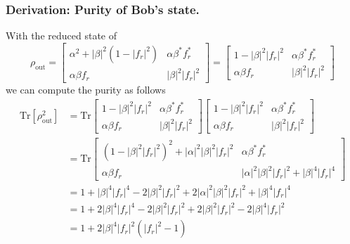 \documentclass[../../../main.tex]{subfiles}
\begin{document}
\subsubsection{Derivation: Purity of Bob's state.}
With the reduced state of
\begin{equation*}
  \rho_\text{out}
  = \begin{bmatrix}
    \alpha^2 + |\beta|^2 (1-|f_r|^2) & \alpha\beta^*  f_r^* \\
    \alpha\beta  f_r                 & |\beta|^2 |f_r|^2
  \end{bmatrix}
  = \begin{bmatrix}
    1- |\beta|^2 |f_r|^2 & \alpha\beta^*  f_r^* \\
    \alpha\beta  f_r     & |\beta|^2 |f_r|^2
  \end{bmatrix}
\end{equation*}
we can compute the purity as follows
\begin{align*}
  \mathrm{Tr} [\rho_\text{out}^2]
   & = \mathrm{Tr}
  \begin{bmatrix}
    1- |\beta|^2 |f_r|^2 & \alpha\beta^*  f_r^* \\
    \alpha\beta  f_r     & |\beta|^2 |f_r|^2
  \end{bmatrix}
  \begin{bmatrix}
    1- |\beta|^2 |f_r|^2 & \alpha\beta^*  f_r^* \\
    \alpha\beta  f_r     & |\beta|^2 |f_r|^2
  \end{bmatrix}                                                                               \\
   & =\mathrm{Tr} \begin{bmatrix}
                    (1-|\beta|^{2}|f_{r}|^{2})^2 + |\alpha|^{2}|\beta|^{2}|f_{r}|^{2} & \alpha\beta^{*}f_{r}^{*} \\
                    \alpha\beta f_{r}                                                 &
                    |\alpha|^{2}|\beta|^{2}|f_{r}|^{2}+|\beta|^{4}|f_{r}|^{4}
                  \end{bmatrix}              \\
   & = 1+ |\beta|^{4}|f_{r}|^{4} - 2|\beta|^{2}|f_{r}|^{2} +   2|\alpha|^{2}|\beta|^{2}|f_{r}|^{2} + |\beta|^{4}|f_{r}|^{4} \\
   & = 1+ 2|\beta|^{4}|f_{r}|^{4} - 2|\beta|^{2}|f_{r}|^{2} +   2|\beta|^{2}|f_{r}|^{2} - 2|\beta|^{4}|f_{r}|^{2}           \\
   & = 1+ 2|\beta|^{4}|f_{r}|^{2}(|f_r| ^2 -1)                                                                              \\
\end{align*}
\end{document}
